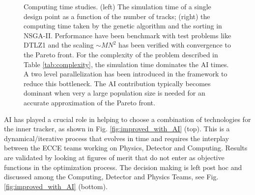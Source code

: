 \begin{figure}[!]
    \caption{Computing time studies. (left) The simulation time of a single design point as a function of the number of tracks; (right) the computing time taken by the genetic algorithm and the sorting in NSGA-II. Performance have been benchmark with test problems like DTLZ1 and the scaling $\sim MN^{2}$ has been verified with convergence to the Pareto front. For the complexity of the problem described in Table \ref{tab:complexity}, the simulation time dominates the AI times. A two level parallelization has been introduced in the framework to reduce this bottleneck.  
    The AI contribution typically becomes dominant when very a large population size is needed for an accurate approximation of the Pareto front. 
}
    \label{fig:computing-times}
\end{figure}

AI has played a crucial role in helping to choose a combination of technologies for the inner tracker, as shown in Fig. \ref{fig:improved_with_AI} (top). 
This is a dynamical/iterative process that evolves in time and requires the interplay between the ECCE teams working on Physics, Detector and Computing.
Results are validated by looking at figures of merit that do not enter as objective functions in the optimization process. The decision making is left post hoc and discussed among the Computing, Detector and Physics Teams, see Fig. \ref{fig:improved_with_AI} (bottom).



